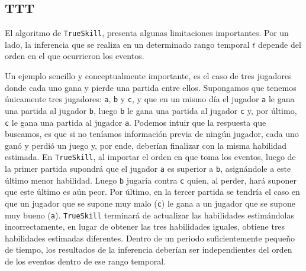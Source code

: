 \documentclass[11pt,twoside,spanish]{report} %
\begin{document}
\subsection{TTT}

El algoritmo de \texttt{TrueSkill}, presenta algunas limitaciones importantes.
Por un lado, la inferencia que se realiza en un determinado rango temporal $t$ depende del orden en el que ocurrieron los eventos.

Un ejemplo sencillo y conceptualmente importante, es el caso de tres jugadores donde cada uno gana y pierde una partida entre ellos.
Supongamos que tenemos \'unicamente tres jugadores: \texttt{a}, \texttt{b} y \texttt{c}, y que en un mismo d\'ia el jugador \texttt{a} le gana una partida al jugador \texttt{b}, luego \texttt{b} le gana una partida al jugador \texttt{c} y, por \'ultimo, \texttt{c} le gana una partida al jugador \texttt{a}.
Podemos intuir que la respuesta que buscamos, es que si no ten\'iamos informaci\'on previa de ning\'un jugador, cada uno gan\'o y perdi\'o un juego y, por ende, deber\'ian finalizar con la misma habilidad estimada.
En \texttt{TrueSkill}, al importar el orden en que toma los eventos, luego de la primer partida supondr\'a que el jugador \texttt{a} es superior a \texttt{b}, asign\'andole a este \'ultimo menor habilidad.
Luego \texttt{b} jugar\'ia contra \texttt{c} quien, al perder, har\'a suponer que este \'ultimo es a\'un peor.
Por \'ultimo, en la tercer partida se tendr\'ia el caso en que un jugador que se supone muy malo (\texttt{c}) le gana a un jugador que se supone muy bueno (\texttt{a}).
\texttt{TrueSkill} terminar\'a de actualizar las habilidades estim\'andolas incorrectamente, en lugar de obtener las tres habilidades iguales, obtiene tres habilidades estimadas diferentes.
Dentro de un periodo suficientemente peque\~no de tiempo, los resultados de la inferencia deber\'ian ser independientes del orden de los eventos dentro de ese rango temporal.
\end{document}
